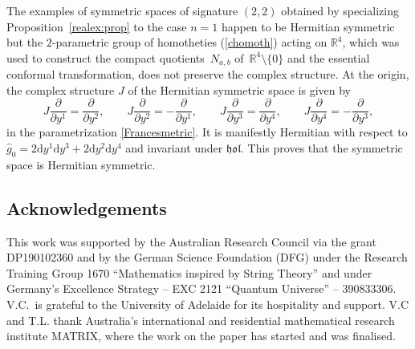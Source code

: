 \documentclass[pdftex]{sigma}
\numberwithin{equation}{section}
\newcommand{\1}{\mathbf{1}}
\renewcommand{\d}{{\mathrm d}}
\newcommand{\+}{\oplus}
\renewcommand{\=}{\equiv}
\newcommand{\R}{\mathbb{R}}
\begin{document}
\begin{Remark} The examples of symmetric spaces of signature $(2,2)$ obtained by specializing Proposition~\ref{realex:prop} to the case $n=1$ happen to be Hermitian symmetric but
the $2$-parametric group of homotheties (\ref{chomoth}) acting on $\R^{4}$, which was used to construct the compact quotients~$N_{a,b}$ of~$\R^4\setminus \{ 0\}$
and the essential conformal transformation,
does not preserve the complex structure. At the origin, the complex structure $J$ of the Hermitian symmetric space is given by
\[ J\frac{\partial}{\partial y^1} = \frac{\partial}{\partial y^2},\qquad J\frac{\partial}{\partial y^2} = -\frac{\partial}{\partial y^1},\qquad J\frac{\partial}{\partial y^3} = \frac{\partial}{\partial y^4},\qquad J\frac{\partial}{\partial y^4} = -\frac{\partial}{\partial y^3},\]
in the parametrization
\eqref{Francesmetric}. It is manifestly Hermitian with respect to $\hat{g}_0=2\d y^1 \d y^3 + 2\d y^2 \d y^4$ and invariant
under $\mathfrak{hol}$. This proves that the symmetric space is Hermitian symmetric.
\end{Remark}

\subsection*{Acknowledgements}
This work was supported by
the Australian Research
Council via the grant DP190102360 and
 by the German Science Foundation (DFG) under
the Research Training Group 1670 ``Mathematics inspired by String Theory'' and under
Germany's Excellence Strategy -- EXC 2121 ``Quantum Universe'' -- 390833306.
V.C.~is grateful to the University of Adelaide for its hospitality and support. V.C and T.L.
thank Australia's international and residential mathematical research institute MATRIX, where the work on the paper has started and was finalised.
\end{document}
